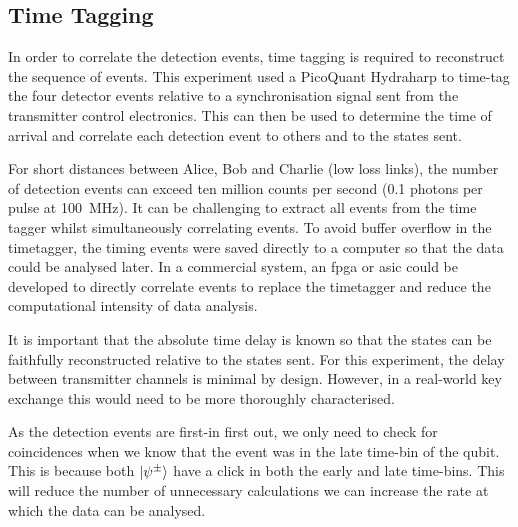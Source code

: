 
\subsection{Time Tagging}

In order to correlate the detection events, time tagging is required to reconstruct the sequence of events. This experiment used a PicoQuant Hydraharp to time-tag the four detector events relative to a synchronisation signal sent from the transmitter control electronics. This can then be used to determine the time of arrival and correlate each detection event to others and to the states sent.

For short distances between Alice, Bob and Charlie (low loss links), the number of detection events can exceed ten million counts per second (0.1 photons per pulse at \SI{100}{MHz}). It can be challenging to extract all events from the time tagger whilst simultaneously correlating events. To avoid buffer overflow in the timetagger, the timing events were saved directly to a computer so that the data could be analysed later. In a commercial system, an \ac{fpga} or \ac{asic} could be developed to directly correlate events to replace the timetagger and reduce the computational intensity of data analysis. 

It is important that the absolute time delay is known so that the states can be faithfully reconstructed relative to the states sent. For this experiment, the delay between transmitter channels is minimal by design. However, in a real-world key exchange this would need to be more thoroughly characterised. 

As the detection events are first-in first out, we only need to check for coincidences when we know that the event was in the late time-bin of the qubit. This is because both $\ket{\psi^\pm}$ have a click in both the early and late time-bins. This will reduce the number of unnecessary calculations we can increase the rate at which the data can be analysed.

%

